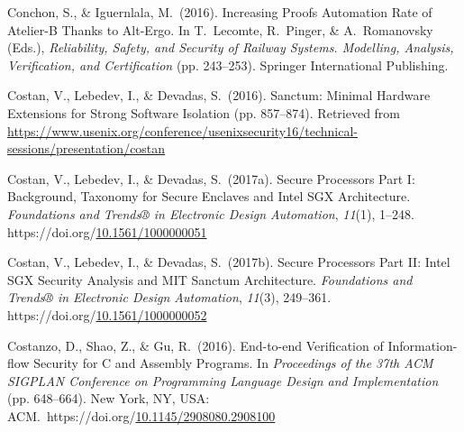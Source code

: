 \documentclass[12pt,twoside]{article}
\begin{document}
{\begin{thebibliography}{222}
\mdbibitemlabel{}Conchon, S., \& Iguernlala, M.~(2016). Increasing Proofs Automation Rate of Atelier-B Thanks to Alt-Ergo. In T.~Lecomte, R.~Pinger, \& A.~Romanovsky (Eds.), \emph{Reliability, Safety, and Security of Railway Systems. Modelling, Analysis, Verification, and Certification} (pp. 243–253). Springer International Publishing.\label{conchon_increasing_2016}%

\mdbibitemlabel{}Costan, V., Lebedev, I., \& Devadas, S.~(2016). Sanctum: Minimal Hardware Extensions for Strong Software Isolation (pp. 857–874). Retrieved from \href{https://www.usenix.org/conference/usenixsecurity16/technical-sessions/presentation/costan}{{\ttfamily https://\hspace{0pt}www.\hspace{0pt}usenix.\hspace{0pt}org/\hspace{0pt}conference/\hspace{0pt}usenixsecurity16/\hspace{0pt}technical-\hspace{0pt}sessions/\hspace{0pt}presentation/\hspace{0pt}costan}}\label{costan_sanctum:_2016}%

\mdbibitemlabel{}Costan, V., Lebedev, I., \& Devadas, S.~(2017a). Secure Processors Part I: Background, Taxonomy for Secure Enclaves and Intel SGX Architecture. \emph{Foundations and Trends® in Electronic Design Automation}, \emph{11}(1), 1–248. https://doi.org/\href{https://dx.doi.org/10.1561/1000000051}{10.1561/1000000051}\label{costan_secure_2017}%

\mdbibitemlabel{}Costan, V., Lebedev, I., \& Devadas, S.~(2017b). Secure Processors Part II: Intel SGX Security Analysis and MIT Sanctum Architecture. \emph{Foundations and Trends® in Electronic Design Automation}, \emph{11}(3), 249–361. https://doi.org/\href{https://dx.doi.org/10.1561/1000000052}{10.1561/1000000052}\label{costan_secure_2017-1}%

\mdbibitemlabel{}Costanzo, D., Shao, Z., \& Gu, R.~(2016). End-to-end Verification of Information-flow Security for C and Assembly Programs. In \emph{Proceedings of the 37th ACM SIGPLAN Conference on Programming Language Design and Implementation} (pp. 648–664). New York, NY, USA: ACM.~https://doi.org/\href{https://dx.doi.org/10.1145/2908080.2908100}{10.1145/2908080.2908100}\label{costanzo_end--end_2016}%


\end{thebibliography}}
\end{document}
